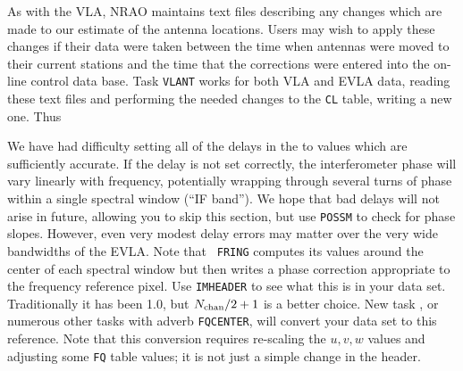 
As with the VLA, NRAO maintains text files describing any changes
which are made to our estimate of the antenna locations.  Users may
wish to apply these changes if their data were taken between the time
when antennas were moved to their current stations and the time that
the corrections were entered into the on-line control data base.  Task
{\tt VLANT} works for both VLA and EVLA data, reading these text files
and performing the needed changes to the {\tt CL} table, writing a new
one.  Thus

We have had difficulty setting all of the delays in the  to
values which are sufficiently accurate.  If the delay is not set
correctly, the interferometer phase will vary linearly with frequency,
potentially wrapping through several turns of phase within a single
spectral window (``IF band'').  We hope that bad delays will not arise
in future, allowing you to skip this section, but use {\tt POSSM} to
check for phase slopes.  However, even very modest delay errors may
matter over the very wide bandwidths of the EVLA\@.  Note that {\tt
FRING} computes its values around the center of each spectral window
but then writes a phase correction appropriate to the frequency
reference pixel.  Use {\tt IMHEADER} to see what this is in your data
set.  Traditionally it has been 1.0, but $N_{\rm chan} / 2 + 1$ is a
better choice.  New task {\tt {}}, or numerous other tasks
with adverb {\tt FQCENTER}, will convert your data set to this
reference.  Note that this conversion requires re-scaling the $u, v,
w$ values and adjusting some {\tt FQ} table values; it is not just a
simple change in the header.

